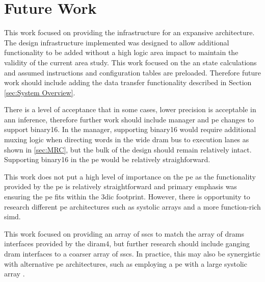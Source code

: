 \section[Future Work]{Future Work}
\label{sec:Future Work}

This work focused on providing the infrastructure for an expansive architecture.
The design infrastructure implemented was designed to allow additional functionality to be added without a high logic area impact to maintain the validity of the current area study.
This work focused on the \ac{an} state calculations and assumed instructions and configuration tables are preloaded.
Therefore future work should include adding the data transfer functionality described in Section \ref{sec:System Overview}.

There is a level of acceptance that in some cases, lower precision is acceptable in \ac{ann} inference, therefore further work should include manager and \ac{pe} changes to support \ac{binary16}.
In the manager, supporting \ac{binary16} would require additional muxing logic when directing words in the wide \ac{dram} bus to execution lanes as shown in \ref{sec:MRC}, but the bulk of the design should remain relatively intact.
Supporting \ac{binary16} in the \ac{pe} would be relatively straighforward.

This work does not put a high level of importance on the \ac{pe} as the functionality provided by the \ac{pe} is relatively straightforward and primary emphasis was ensuring the \ac{pe} fits within the \ac{3dic} footprint.
However, there is opportunity to research different \ac{pe} architectures such as systolic arrays and a more function-rich \ac{simd}.

This work focused on providing an array of \acp{ssc} to match the array of \acp{dram} interfaces provided by the \ac{diram4}, but further research should include ganging \ac{dram} interfaces to a coarser array of \acp{ssc}.
In practice, this may also be synergistic with alternative \ac{pe} architectures, such as employing a \ac{pe} with a large systolic array \cite{tensorflow2015-whitepaper}.

